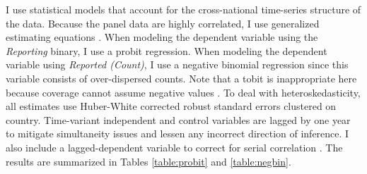 \documentclass[11pt, oneside]{article}
\begin{document}
I use statistical models that account for the cross-national time-series structure of the data. Because the panel data are highly correlated, I use generalized estimating equations \cite{zorn2001}. When modeling the dependent variable using the \emph{Reporting} binary, I use a probit regression. When modeling the dependent variable using \emph{Reported (Count)}, I use a negative binomial regression since this variable consists of over-dispersed counts. Note that a tobit is inappropriate here because coverage cannot assume negative values \cite{sigelman1999}. To deal with heteroskedasticity, all estimates use Huber-White corrected robust standard errors clustered on country.  Time-variant independent and control variables are lagged by one year to mitigate simultaneity issues and lessen any incorrect direction of inference. I also include a lagged-dependent variable to correct for serial correlation \cite{wooldridge2010}. The results are summarized in Tables \ref{table:probit} and \ref{table:negbin}.



\end{document}
